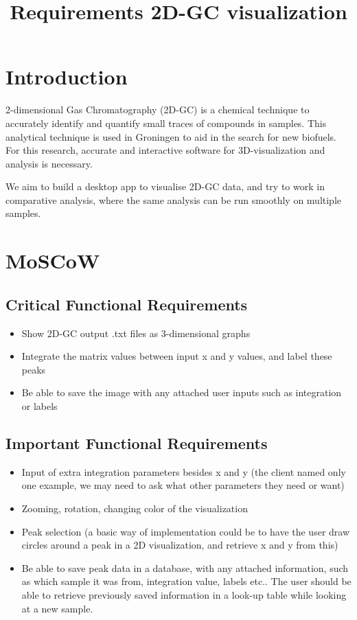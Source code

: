\documentclass{article}
\title{Requirements 2D-GC visualization}
\author{}
\date{}
\begin{document}
\maketitle

\section{Introduction}

2-dimensional Gas Chromatography (2D-GC) is a chemical technique to accurately identify and quantify small traces of compounds in samples. This analytical technique is used in Groningen to aid in the search for new biofuels. For this research, accurate and interactive software for 3D-visualization and analysis is necessary. 

We aim to build a desktop app to visualise 2D-GC data, and try to work in comparative analysis, where the same analysis can be run smoothly on multiple samples. 

\section{MoSCoW}
\subsection*{Critical Functional Requirements}
\begin{itemize}
	\item Show 2D-GC output .txt files as 3-dimensional graphs
    \item Integrate the matrix values between input x and y values, and label these peaks
    \item Be able to save the image with any attached user inputs such as integration or labels
\end{itemize}

\subsection*{Important Functional Requirements}
\begin{itemize}
	\item Input of extra integration parameters besides x and y (the client named only one example, we may need to ask what other parameters they need or want)
	\item Zooming, rotation, changing color of the visualization
	\item Peak selection (a basic way of implementation could be to have the user draw circles around a peak in a 2D visualization, and retrieve x and y from this)
    \item Be able to save peak data in a database, with any attached information, such as which sample it was from, integration value, labels etc.. The user should be able to retrieve previously saved information in a look-up table while looking at a new sample.
\end{itemize}
\end{document}

